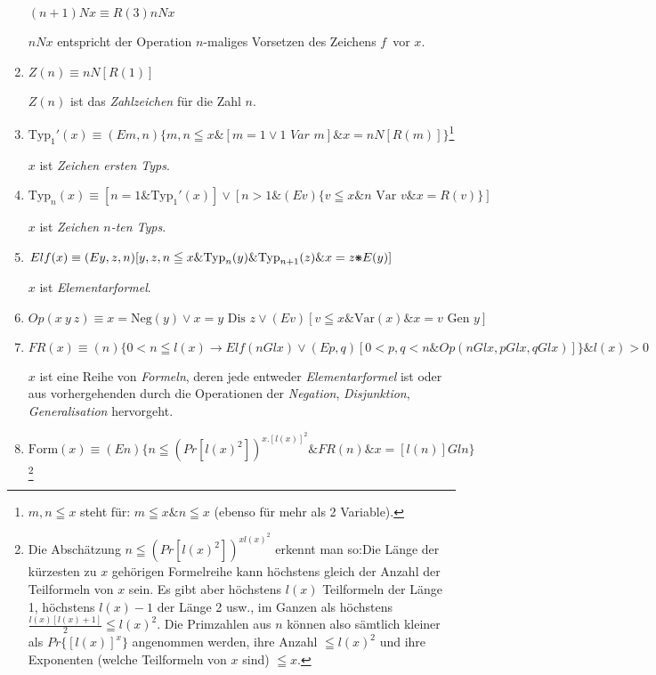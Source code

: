 \documentclass{scrartcl}
\newcommand{\fnvierunddreissigb}{34b}
\DeclareRobustCommand*{\pmstar}{%
  \text{%
      \resizebox{!}{.75\height}{\ding{107}}%
        }%
}
\begin{document}
\begin{enumerate}[1.]
	$(n + 1) N x \equiv R(3) n N x$

	$n N x$ entspricht der Operation \glqq$n$-maliges
	Vorsetzen des Zeichens \glq$f$\grq\ vor $x$\grqq.

	\item $Z(n) \equiv n N[R(1)]$

	$Z(n)$ ist das \textit{Zahlzeichen} für die Zahl $n$.

	\let\originalfootnote=\thefootnote
	\let\thefootnote=\fnvierunddreissigb
	\item $\text{Typ}_1'(x) \equiv (Em, n) \{m, n\leqq x \& [m = 1 \lor 1\textit{ Var } m] \& x = n N [R(m)]\}$\footnote{$m, n \leqq x$ steht für: $m \leqq x \& n \leqq x$ (ebenso für mehr als 2 Variable).}
	\let\thefootnote=\originalfootnote
	\setcounter{footnote}{34}

	$x$ ist \textit{Zeichen ersten Typs}.

	\item $\text{Typ}_n(x) \equiv [n = 1 \& \text{Typ}_1'(x)] \lor [n > 1 \& (Ev) \{v \leqq x \& n\text{ Var } v \& x = R(v)\}]$

	$x$ ist \textit{Zeichen $n$-ten Typs}.

	\item $Elf(x) \equiv (E y, z, n) [y, z, n \leqq x \& \text{Typ}_n(y) \& \text{Typ}_{n + 1}(z) \& x = z \pmstar E(y)]$

	$x$ ist \textit{Elementarformel}.

	\item $Op(x\ y\ z) \equiv x = \text{Neg}(y) \lor x = y \text{ Dis } z \lor (Ev) [v \leqq x \& \text{Var}(x) \& x = v \text{ Gen } y]$

	\item $FR(x) \equiv (n) \{ 0 < n \leqq l(x) \longrightarrow Elf(n Gl x) \lor (Ep, q) [0 < p, q < n \& Op(n Gl x, p Gl x, q Gl x)]\} \& l(x) > 0$

	$x$ ist eine Reihe von \textit{Formeln}, deren jede entweder
	\textit{Elementarformel} ist oder aus vorhergehenden durch die Operationen der \textit{Negation},
	\textit{Disjunktion}, \textit{Generalisation} hervorgeht.

	\item $\text{Form}(x) \equiv (En) \{n \leqq (Pr [l(x)^2])^{x.[l(x)]^2} \& FR(n) \& x = [l(n)] Gl n\}$\footnote{Die Abschätzung $n \leqq (Pr [l(x)^2])^{x l(x)^2}$ erkennt man so:Die Länge der kürzesten zu $x$ gehörigen Formelreihe kann höchstens gleich der Anzahl der Teilformeln von $x$ sein. Es gibt aber höchstens $l(x)$ Teilformeln der Länge 1, höchstens $l(x) - 1$ der Länge 2 usw., im Ganzen als höchstens $\frac{l(x)[l(x) + 1]}{2} \leqq l(x)^2$. Die Primzahlen aus $n$ können also sämtlich kleiner als $Pr\{[l(x)]^x\}$ angenommen werden, ihre Anzahl $\leqq l(x)^2$ und ihre Exponenten (welche Teilformeln von $x$ sind) $\leqq x$.}


\end{enumerate}
\end{document}

